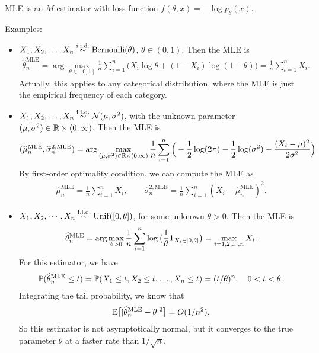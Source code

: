 \documentclass[11pt,letterpaper]{article}
\numberwithin{assumption}{lecture}
\numberwithin{theorem}{lecture}
\numberwithin{proposition}{lecture}
\numberwithin{lemma}{lecture}
\numberwithin{claim}{lecture}
\numberwithin{corollary}{lecture}
\numberwithin{definition}{lecture}
\numberwithin{conjecture}{lecture}
\numberwithin{remark}{lecture}
\numberwithin{example}{lecture}
\numberwithin{equation}{lecture}
\begin{document}
MLE is an $M$-estimator with loss function $f(\theta, x) = - \log p_\theta (x)$.

Examples:
\begin{itemize}
  \item $X_1, X_2, \ldots, X_n \overset{\mathrm{i.i.d.}}{\sim} \mathrm{Bernoulli} (\theta)$, $\theta \in (0, 1)$. Then the MLE is
  \begin{align*}
    \widehat{\theta}_n^{\mathrm{MLE}} = \arg\max_{\theta \in [0, 1]} \frac{1}{n} \sum_{i=1}^n \big( X_i \log \theta + (1 - X_i) \log (1 - \theta) \big) = \frac{1}{n} \sum_{i=1}^n X_i.
  \end{align*}
  Actually, this applies to any categorical distribution, where the MLE is just the empirical frequency of each category.
  \item $X_1, X_2, \ldots, X_n \overset{\mathrm{i.i.d.}}{\sim} \mathcal{N} (\mu, \sigma^2)$, with the unknown parameter $(\mu, \sigma^2) \in \mathbb{R} \times (0, \infty)$. Then the MLE is
  \begin{align*}
    (\widehat{\mu}_n^{\mathrm{MLE}}, \widehat{\sigma}_n^{2, \mathrm{MLE}}) = \arg\max_{(\mu, \sigma^2) \in \mathbb{R} \times (0, \infty)} \frac{1}{n} \sum_{i=1}^n \Big( -\frac{1}{2} \log (2\pi) - \frac{1}{2} \log (\sigma^2) - \frac{(X_i - \mu)^2}{2\sigma^2} \Big)
  \end{align*}
  By first-order optimality condition, we can compute the MLE as
  \begin{align*}
    \widehat{\mu}_n^{\mathrm{MLE}} = \frac{1}{n} \sum_{i=1}^n X_i, \qquad \widehat{\sigma}_n^{2, \mathrm{MLE}} = \frac{1}{n} \sum_{i=1}^n (X_i - \widehat{\mu}_n^{\mathrm{MLE}})^2.
  \end{align*}
  \item $X_1, X_2, \cdots, X_n \overset{\mathrm{i.i.d.}}{\sim} \mathrm{Unif} ([0, \theta])$, for some unknown $\theta > 0$. Then the MLE is
  \begin{align*}
    \widehat{\theta}_n^{\mathrm{MLE}} = \arg\max_{\theta > 0} \frac{1}{n} \sum_{i=1}^n \log \big( \frac{1}{\theta} \bm{1}_{X_i \in [0, \theta]}  \big) = \max_{i=1, 2, \ldots, n} X_i.
  \end{align*}
  For this estimator, we have
  \begin{align*}
    {\mathbb{P}} (\widehat{\theta}_n^{\mathrm{MLE}} \leq t) = {\mathbb{P}} (X_1 \leq t, X_2 \leq t, \ldots, X_n \leq t) = (t / \theta)^n, \quad 0 < t < \theta.
  \end{align*}
  Integrating the tail probability, we know that
  \begin{align*}
    {\mathbb{E}} \big[ |\widehat{\theta}_n^{\mathrm{MLE}} - \theta|^2 \big] = O(1/n^2).
  \end{align*}
  So this estimator is not asymptotically normal, but it converges to the true parameter $\theta$ at a faster rate than $1/\sqrt{n}$.
\end{itemize}
\end{document}
